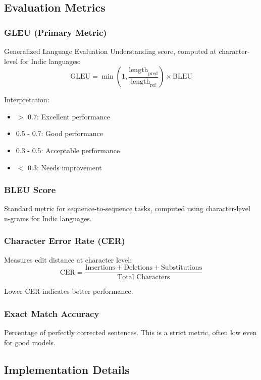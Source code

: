 \documentclass[12pt,a4paper]{article}
\begin{document}
\subsection{Evaluation Metrics}

\subsubsection{GLEU (Primary Metric)}
Generalized Language Evaluation Understanding score, computed at character-level for Indic languages:
\begin{equation}
    \text{GLEU} = \min\left(1, \frac{\text{length}_{\text{pred}}}{\text{length}_{\text{ref}}}\right) \times \text{BLEU}
\end{equation}

Interpretation:
\begin{itemize}
    \item $>$ 0.7: Excellent performance
    \item 0.5 - 0.7: Good performance
    \item 0.3 - 0.5: Acceptable performance
    \item $<$ 0.3: Needs improvement
\end{itemize}

\subsubsection{BLEU Score}
Standard metric for sequence-to-sequence tasks, computed using character-level n-grams for Indic languages.

\subsubsection{Character Error Rate (CER)}
Measures edit distance at character level:
\begin{equation}
    \text{CER} = \frac{\text{Insertions} + \text{Deletions} + \text{Substitutions}}{\text{Total Characters}}
\end{equation}

Lower CER indicates better performance.

\subsubsection{Exact Match Accuracy}
Percentage of perfectly corrected sentences. This is a strict metric, often low even for good models.

\subsection{Implementation Details}
\end{document}
